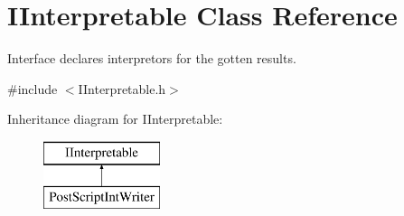 \hypertarget{class_i_interpretable}{}\section{I\+Interpretable Class Reference}
\label{class_i_interpretable}


Interface declares interpretors for the gotten results.  




{\ttfamily \#include $<$I\+Interpretable.\+h$>$}

Inheritance diagram for I\+Interpretable\+:\begin{figure}[H]
\begin{center}
\leavevmode
\includegraphics[height=2.000000cm]{class_i_interpretable}
\end{center}
\end{figure}
